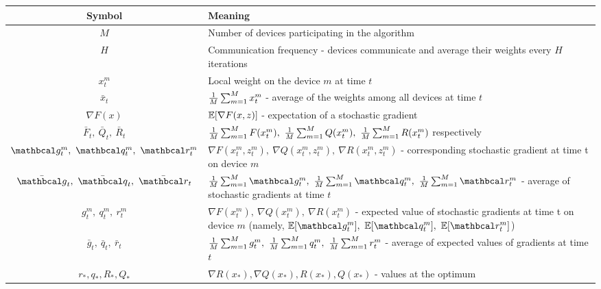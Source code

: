 \renewcommand{\arraystretch}{2.5} %
\begin{table}[htbp]
\centering
\begin{tabular}{|c|p{12cm}|}
\hline
\textbf{Symbol} & \textbf{Meaning} \\
\hline

$M$ & Number of devices participating in the algorithm \\

$H$ & Communication frequency - devices communicate and average their weights every $H$ iterations \\

\( x^m_t \) & Local weight on the device $m$ at time $t$ \\

\(\bar{x}_t\) & \( \fsumm{m=1}{M} x^m_t \) - average of the weights among all devices at time $t$ \\



\( \nabla F(x) \) & \( \E[\nabla F(x, z)] \) - expectation of a stochastic gradient \\

\( \bar{F}_t, \ \bar{Q}_t, \ \bar{R}_t \) & \( \fsumm{m=1}{M} F(x^m_t),\ \fsumm{m=1}{M} Q(x^m_t),\ \fsumm{m=1}{M} R(x^m_t) \) respectively \\


\( \mc{g}^m_t, \ \mc{q}^m_t, \ \mc{r}^m_t \) & \( \nabla F(x^m_t, z^m_t),\ \nabla Q(x^m_t, z^m_t),\ \nabla R(x^m_t, z^m_t) \) - corresponding stochastic gradient at time t on device $m$ \\

\( \bar{\mc{g}}_t, \ \bar{\mc{q}}_t, \ \bar{\mc{r}}_t \) & \( \fsumm{m=1}{M} \mc{g}^m_t,\ \fsumm{m=1}{M} \mc{q}^m_t,\ \fsumm{m=1}{M} \mc{r}^m_t \) - average of stochastic gradients at time $t$ \\

\( g^m_t, \ q^m_t, \ r^m_t \) & \( \nabla F(x^m_t),\ \nabla Q(x^m_t),\ \nabla R(x^m_t) \) - expected value of stochastic gradients at time t on device $m$ (namely, 
\( \E[\mc{g}^m_t], \ \E[\mc{q}^m_t], \ \E[\mc{r}^m_t] \)) \\

\( \bar{{g}}_t, \ \bar{{q}}_t, \ \bar{{r}}_t \) & \( \fsumm{m=1}{M} {g}^m_t,\ \fsumm{m=1}{M} {q}^m_t,\ \fsumm{m=1}{M} {r}^m_t \) - average of expected values of gradients at time $t$ \\

\( r_*, q_*, R_*, Q_* \) & \( \nabla R(x_*), \nabla Q(x_*), R(x_*), Q(x_*) \) - values at the optimum \\



\end{tabular}
\end{table}
